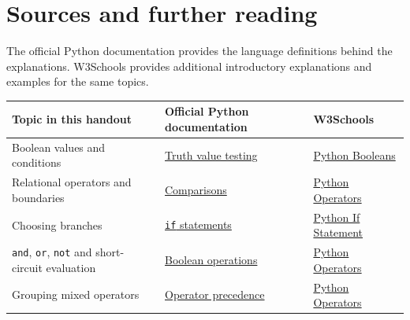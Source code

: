\documentclass[12pt,a4paper]{article}
\begin{document}
\section*{Sources and further reading}
The official Python documentation provides the language definitions behind the explanations. W3Schools provides additional introductory explanations and examples for the same topics.

\begingroup\small\renewcommand{\arraystretch}{1.3}\begin{longtable}{>{\raggedright\arraybackslash}p{}>{\raggedright\arraybackslash}p{}>{\raggedright\arraybackslash}p{}}
\toprule
\rowcolor{panel} Topic in this handout & Official Python documentation & W3Schools \\ \midrule\endhead
Boolean values and conditions & \href{https://docs.python.org/3/library/stdtypes.html\#truth-value-testing}{Truth value testing} & \href{https://www.w3schools.com/python/python_booleans.asp}{Python Booleans} \\
Relational operators and boundaries & \href{https://docs.python.org/3/library/stdtypes.html\#comparisons}{Comparisons} & \href{https://www.w3schools.com/python/python_operators.asp}{Python Operators} \\
Choosing branches & \href{https://docs.python.org/3/tutorial/controlflow.html\#if-statements}{\texttt{if} statements} & \href{https://www.w3schools.com/python/python_conditions.asp}{Python If Statement} \\
\texttt{and}, \texttt{or}, \texttt{not} and short-circuit evaluation & \href{https://docs.python.org/3/library/stdtypes.html\#boolean-operations-and-or-not}{Boolean operations} & \href{https://www.w3schools.com/python/python_operators.asp}{Python Operators} \\
Grouping mixed operators & \href{https://docs.python.org/3/reference/expressions.html\#operator-precedence}{Operator precedence} & \href{https://www.w3schools.com/python/python_operators.asp}{Python Operators} \\
\bottomrule\end{longtable}\endgroup
\end{document}
